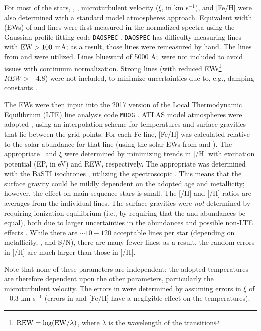 For most of the stars, \teff, \logg, microturbulent velocity ($\xi$, in km s$^{-1}$), and [Fe/H] were also determined with a standard model atmospheres approach.  Equivalent width (EWs) of  and  lines were first measured in the normalized spectra using the Gaussian profile fitting code {\tt DAOSPEC} \citep{DAOSPECref}.  {\tt DAOSPEC} has difficulty measuring lines with $\rm{EW} > 100$ m\AA; as a result, those lines were remeasured by hand.  The lines from \citet{Fulbright2006} and \citet{McWilliam2013} were utilized.  Lines blueward of 5000 \AA $;$ were not included to avoid issues with continuum normalization. Strong lines (with reduced EWs\footnote{$\rm{REW} = \log(\rm{EW}/\lambda)$, where $\lambda$ is the wavelength of the transition} $REW>-4.8$) were not included, to minimize uncertainties due to, e.g., damping constants \citep{McWilliam1995}.

The EWs were then input into the 2017 version of the Local Thermodynamic Equilibrium (LTE) line analysis code {\tt MOOG} \citep{Sneden}.  ATLAS model atmospheres were adopted \citep{KuruczModelAtmRef}, using an interpolation scheme for temperatures and surface gravities that lie between the grid points. For each Fe line, [Fe/H] was calculated relative to the solar abundance for that line (using the solar EWs from \citealt{Fulbright2006} and \citealt{McWilliam2013}).  The appropriate \teff\ and  $\xi$ were determined by minimizing trends in [/H] with excitation potential (EP, in eV) and REW, respectively.  The appropriate \logg was determined with the BaSTI isochrones \citep{BaSTIref}, utilizing the spectroscopic \teff.  This means that the surface gravity could be mildly dependent on the adopted age and metallicity; however, the effect on main sequence stars is small.  The [/H] and [/H] ratios are averages from the individual lines.  The surface gravities were {\it not} determined by requiring ionization equilibrium (i.e., by requiring that the  and  abundances be equal), both due to larger uncertainties in the  abundances and possible non-LTE effects \citep{KraftIvans2003}.  While there are $\sim 10-120$ acceptable  lines per star (depending on metallicity, \teff, and S/N), there are many fewer  lines; as a result, the random errors in [/H] are much larger than those in [/H].

Note that none of these parameters are independent; the adopted temperatures are therefore dependent upon the other parameters, particularly the microturbulent velocity.  The errors in \teff were determined by assuming errors in $\xi$ of $\pm 0.3$ km s$^{-1}$ (errors in \logg and [Fe/H] have a negligible effect on the temperatures).

